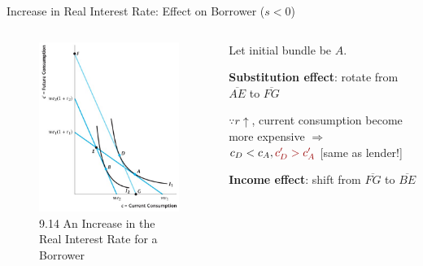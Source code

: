 \documentclass[11pt,aspectratio=169,usenames,dvipsnames]{beamer}
\newcommand{\red}[1]{\textcolor{red}{#1}}
\let\tempone\itemize
\let\temptwo\enditemize
\renewenvironment{itemize}{\tempone\addtolength{\itemsep}{\fill}}{\temptwo}
\begin{document}
\begin{frame}{Increase in Real Interest Rate: Effect on Borrower ($s < 0$)}
\label{slide:Increase_in_Real_Interest_Rate__Effect_on_Borrower}
    \begin{columns}
        \begin{column}{0.5\textwidth}
            \begin{figure}
                \caption{\scriptsize 9.14  An Increase in the Real Interest Rate for a Borrower}
                \includegraphics[width=.8\textwidth]{./figures/Figure9_14.jpg}
            \end{figure}
        \end{column}
        \begin{column}{0.5\textwidth}
            Let initial bundle be $ A $.
            \begin{itemize}
                \item \textbf{Substitution effect}: rotate from $ \overline{AE} $ to $ \overline{FG} $
                \begin{itemize}
                    \item $ \because r \uparrow  $, \alert{current consumption become more expensive} $ \Rightarrow  $ $ c_{D} < c_{A}, \red{c'_{D} > c'_{A}} $ [same as lender!]
                \end{itemize}
                \item \textbf{Income effect}: shift from $ \overline{FG} $ to $ \overline{BE} $

\end{itemize}
\end{column}
\end{columns}
\end{frame}
\end{document}
